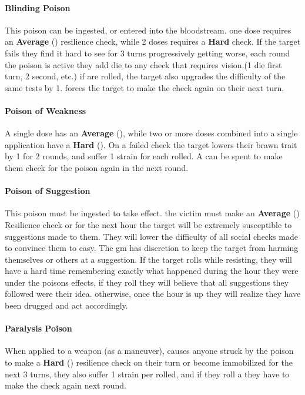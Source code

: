 \begin{multicols}{2}
\paragraph{Blinding Poison} \label{poison:blinding}
This poison can be ingested, or entered into the bloodstream.
one dose requires an \textbf{Average} (\difficulty\difficulty\difficulty)
resilience check, while 2 doses requires a \textbf{Hard} check. If the target
fails they find it hard to see for 3 turns progressively getting worse,
each round the poison is active they add \setback die to any check
that requires vision.(1 die first turn, 2 second, etc.) if \threat\threat\threat
are rolled, the target also upgrades the difficulty of the same tests
by 1. \despair forces the target to make the check again on their next turn.

\paragraph{Poison of Weakness} \label{poison:weakness}
A single dose has an \textbf{Average} (\difficulty\difficulty), while two or more
doses combined into a single application have a
\textbf{Hard} (\difficulty\difficulty\difficulty). On a failed check the
target lowers their brawn trait by 1 for 2 rounds, and suffer 1 strain
for each \threat rolled. A \despair can be spent to make them check for
the poison again in the next round.

\paragraph{Poison of Suggestion} \label{poison:suggestion}
This poison must be ingested to take effect. the victim must make an
\textbf{Average} (\difficulty\difficulty) Resilience check or for the next hour
the target will be extremely susceptible to suggestions made to them.
They will lower the difficulty of all social checks made to convince
them to easy. The gm has discretion to keep the target from harming
themselves or others at a suggestion. If the target rolls \threat\threat\threat
while resisting, they will have a hard time remembering exactly what
happened during the hour they were under the poisons effects, if they
roll \despair they will believe that all suggestions they followed
were their idea. otherwise, once the hour is up they will realize
they have been drugged and act accordingly.

\paragraph{Paralysis Poison} \label{poison:paralysis}
When applied to a weapon (as a maneuver), causes anyone
struck by the poison to make a \textbf{Hard} (\difficulty\difficulty\difficulty)
resilience check on their turn or become immobilized for
the next 3 turns, they also suffer 1 strain per \threat
rolled, and if they roll a \despair they have to make the
check again next round.


\end{multicols}
